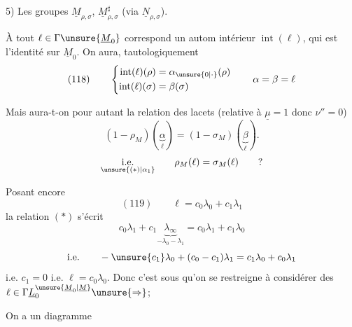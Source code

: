 

5) Les groupes $\underline M_{\rho,\sigma}$, $\underline M_{\rho,\sigma}^{\sharp}$ (via $\underline N_{\rho,\sigma}$).

À tout $\ell\in\Gamma\unsure{\underline M_0}$ correspond un autom intérieur $\operatorname{int}(\ell)$, qui est l'identité sur $\underline M_0$. On aura, tautologiquement
\[
(118)\qquad
\left\{\begin{aligned}
\operatorname{int}(\ell)(\rho)&=\alpha_{\unsure{0|\cdot}}(\rho)\\
\operatorname{int}(\ell)(\sigma)&=\beta(\sigma)
\end{aligned}\right.
\qquad\alpha=\beta=\ell
\]

Mais  aura-t-on pour autant la relation des lacets (relative à $\underline\mu=1$ donc $\nu''=0$)
\[
(1-\rho_M)(\underbrace{\alpha}_{\ell})=(1-\sigma_M)(\underbrace{\beta}_{\ell}).
\]
\[
\underset{\unsure{(*)|\alpha_1}}{\text{i.e.}}\qquad
\rho_M(\ell)=\sigma_M(\ell)\qquad ?
\]

Posant encore
\[
(119)\qquad\ell=c_0\lambda_0+c_1\lambda_1
\]
la relation $(*)$ s'écrit
\[
c_0\lambda_1+c_1\underbrace{\lambda_\infty}_{-\lambda_0-\lambda_1}
=c_0\lambda_1+c_1\lambda_0
\]
\[
\text{i.e.}\qquad-\unsure{c_1}\lambda_0+(c_0-c_1)\lambda_1
=c_1\lambda_0+c_0\lambda_1
\]
i.e. $c_1=0$ i.e. $\ell=c_0\lambda_0$. Donc c'est sous  qu'on se restreigne à considérer des $\ell\in\Gamma\underline L_0^{\unsure{\underline M_0|\underline M}}\unsure{\Rightarrow}$; 


On a un  diagramme


